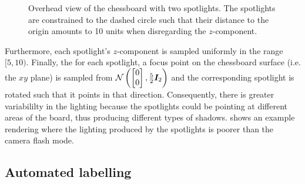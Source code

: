 \begin{enumerate}
\begin{figure}
            \caption{Overhead view of the chessboard with two spotlights. The spotlights are constrained to the dashed circle such that their distance to the origin amounts to 10 units when disregarding the $z$-component.}
            \label{fig:chessboard_lighting_circle}
        \end{figure}
        Furthermore, each spotlight's $z$-component is sampled uniformly in the range $[5, 10)$.
        Finally, the for each spotlight, a focus point on the chessboard surface (i.e. the $xy$ plane) is sampled from
        \(
            \mathcal{N}\left(
                \begin{bmatrix}
                    0 \\ 0
                \end{bmatrix},
                \frac{5}{2} {\bm{I}}_2
            \right)
        \)
        and the corresponding spotlight is rotated such that it points in that direction.
        Consequently, there is greater variabililty in the lighting because the spotlights could be pointing at different areas of the board, thus producing different types of shadows.
         shows an example rendering where the lighting produced by the spotlights is poorer than the camera flash mode.
\end{enumerate}

\subsection{Automated labelling}
